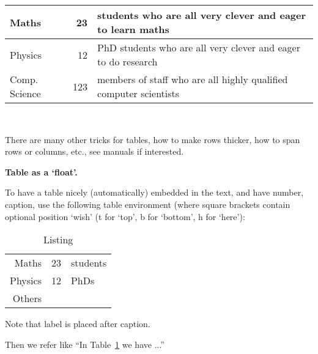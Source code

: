 \documentclass{article}
\begin{document}
\begin{tabular}{|l|rp{6cm}|}
\hline
Maths& 23& students who are all very clever and eager to learn maths\\
\hline
Physics&12&PhD students who are all very clever and eager to do research \\
\hline
Comp. Science&123 & members of staff who are all highly qualified computer scientists
\\
\hline
\end{tabular}

\


There are many other tricks for tables, how to make rows thicker, how to span rows or columns, etc., see manuals if interested.


\textbf{Table as a `float'.}


To have a table nicely (automatically) embedded in the text, and have number, caption,
use the following table environment (where square  brackets contain optional position `wish' (t for `top', b for `bottom', h for `here'):

\begin{table}[h]\caption{Listing}\label{t1} \centering %
\begin{tabular}{|r|cl|} %
\hline
Maths& 23& students\\
Physics&12&PhDs\\
\hline\hline
Others&& \\
\hline
\end{tabular}
\end{table}

Note that label is placed after caption.

Then we refer like ``In Table~\ref{t1} we have ...''
\end{document}
